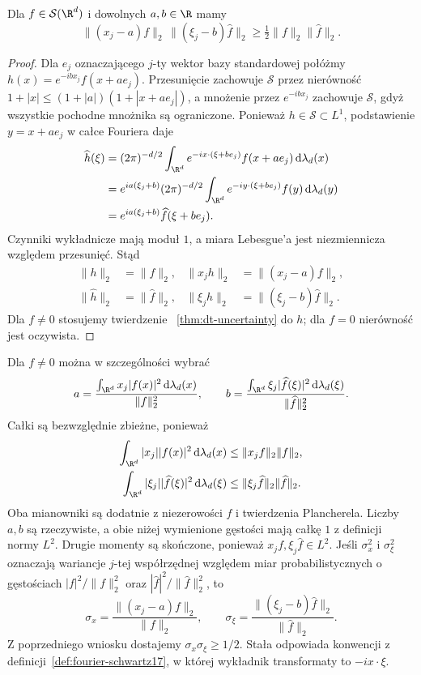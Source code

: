 \begin{wniosek}
Dla $f\in\mathcal S(\R^d)$ i dowolnych $a,b\in\R$
mamy
\[
 \|(x_j-a)f\|_2\,\|(\xi_j-b)\widehat f\|_2
 \ge\tfrac12\|f\|_2\|\widehat f\|_2.
\]
\end{wniosek}
\begin{proof}
Dla $e_j$ oznaczającego $j$-ty wektor
bazy standardowej połóżmy
$h(x)=e^{-ibx_j}f(x+ae_j)$.
Przesunięcie zachowuje $\mathcal S$ przez
nierówność $1+|x|\le(1+|a|)(1+|x+ae_j|)$,
a mnożenie przez $e^{-ibx_j}$ zachowuje
$\mathcal S$, gdyż wszystkie pochodne
mnożnika są ograniczone.
Ponieważ $h\in\mathcal S\subset L^1$,
podstawienie $y=x+ae_j$ w całce Fouriera daje
\[
 \begin{aligned}
 \widehat h(\xi)
 &=(2\pi)^{-d/2}\int_{\R^d}e^{-ix\cdot(\xi+be_j)}
 f(x+ae_j)\,\mathrm d\lambda_d(x)\\
 &=e^{ia(\xi_j+b)}(2\pi)^{-d/2}
 \int_{\R^d}e^{-iy\cdot(\xi+be_j)}f(y)
 \,\mathrm d\lambda_d(y)\\
 &=e^{ia(\xi_j+b)}\widehat f(\xi+be_j).
 \end{aligned}
\]
Czynniki wykładnicze mają moduł $1$,
a miara Lebesgue'a jest niezmiennicza
względem przesunięć. Stąd
\[
 \begin{aligned}
 \|h\|_2&=\|f\|_2,&
 \|x_jh\|_2&=\|(x_j-a)f\|_2,\\
 \|\widehat h\|_2&=\|\widehat f\|_2,&
 \|\xi_j\widehat h\|_2&=\|(\xi_j-b)\widehat f\|_2.
 \end{aligned}
\]
Dla $f\ne0$ stosujemy twierdzenie
~\ref{thm:dt-uncertainty} do $h$;
dla $f=0$ nierówność jest oczywista.
\end{proof}

Dla $f\ne0$ można w szczególności wybrać
\[
 a=\frac{\int_{\R^d}x_j|f(x)|^2\,
 \mathrm d\lambda_d(x)}{\|f\|_2^2},
 \qquad
 b=\frac{\int_{\R^d}\xi_j|\widehat f(\xi)|^2\,
 \mathrm d\lambda_d(\xi)}{\|\widehat f\|_2^2}.
\]
Całki są bezwzględnie zbieżne, ponieważ
\[
 \begin{aligned}
 \int_{\R^d}|x_j||f(x)|^2\,\mathrm d\lambda_d(x)
 &\le\|x_jf\|_2\|f\|_2,\\
 \int_{\R^d}|\xi_j||\widehat f(\xi)|^2\,
 \mathrm d\lambda_d(\xi)
 &\le\|\xi_j\widehat f\|_2\|\widehat f\|_2.
 \end{aligned}
\]
Oba mianowniki są dodatnie z niezerowości $f$
i twierdzenia Plancherela. Liczby $a,b$ są
rzeczywiste, a obie niżej wymienione gęstości
mają całkę $1$ z definicji normy $L^2$.
Drugie momenty są skończone, ponieważ
$x_jf,\xi_j\widehat f\in L^2$.
Jeśli $\sigma_x^2$ i $\sigma_\xi^2$
oznaczają wariancje $j$-tej współrzędnej
względem miar probabilistycznych o gęstościach
$|f|^2/\|f\|_2^2$ oraz
$|\widehat f|^2/\|\widehat f\|_2^2$, to
\[
 \sigma_x=\frac{\|(x_j-a)f\|_2}{\|f\|_2},
 \qquad
 \sigma_\xi=\frac{\|(\xi_j-b)\widehat f\|_2}
 {\|\widehat f\|_2}.
\]
Z poprzedniego wniosku dostajemy
$\sigma_x\sigma_\xi\ge1/2$.
Stała odpowiada konwencji z definicji~\ref{def:fourier-schwartz17},
w której wykładnik transformaty to $-ix\cdot\xi$.
